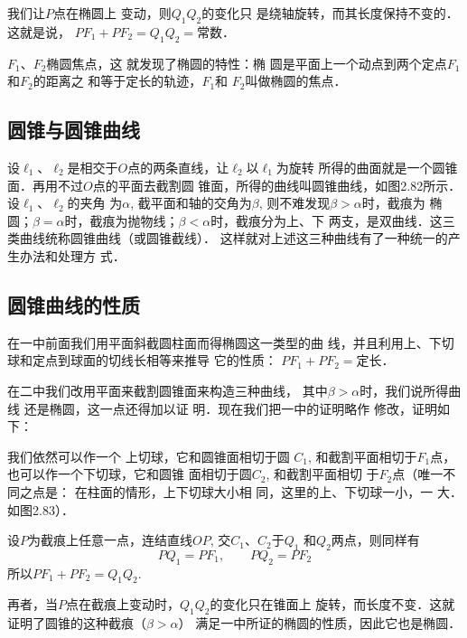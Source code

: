 我们让$P$点在椭圆上
变动，则$Q_1Q_2$的变化只
是绕轴旋转，而其长度保持不变的．这就是说，
$PF_1+PF_2=Q_1Q_2=$常数．

$F_1$、$F_2$椭圆焦点，这
就发现了椭圆的特性：椭
圆是平面上一个动点到两个定点$F_1$和$F_2$的距离之
和等于定长的轨迹，$F_1$和
$F_2$叫做椭圆的焦点．

\subsection{圆锥与圆锥曲线}

设$\ell_1$、$\ell_2$是相交于$O$点的两条直线，让$\ell_2$以$\ell_1$为旋转
所得的曲面就是一个圆锥面．再用不过$O$点的平面去截割圆
锥面，所得的曲线叫圆锥曲线，如图2.82所示．设$\ell_1$、$\ell_2$的夹角
为$\alpha$, 截平面和轴的交角为$\beta$, 则不难发现$\beta>\alpha$时，截痕为
椭圆；$\beta=\alpha$时，截痕为抛物线；$\beta<\alpha$时，截痕分为上、下
两支，是双曲线．这三类曲线统称圆锥曲线（或圆锥截线）．
这样就对上述这三种曲线有了一种统一的产生办法和处理方
式．

\subsection{圆锥曲线的性质}
在一中前面我们用平面斜截圆柱面而得椭圆这一类型的曲
线，并且利用上、下切球和定点到球面的切线长相等来推导
它的性质：
$PF_1+PF_2=$定长．

在二中我们改用平面来截割圆锥面来构造三种曲线，
其中$\beta>\alpha$时，我们说所得曲线
还是椭圆，这一点还得加以证
明．现在我们把一中的证明略作
修改，证明如下：

我们依然可以作一个
上切球，它和圆锥面相切于圆
$C_1$, 和截割平面相切于$F_1$点，
也可以作一个下切球，它和圆锥
面相切于圆$C_2$, 和截割平面相切
于$F_2$点（唯一不同之点是：
在柱面的情形，上下切球大小相
同，这里的上、下切球一小，一
大．如图2.83）．

设$P$为截痕上任意一点，连结直线$OP$, 交$C_1$、$C_2$于$Q_1$
和$Q_2$两点，则同样有
\[PQ_1=PF_1,\qquad PQ_2=PF_2\]
所以$PF_1+PF_2=Q_1Q_2$.

再者，当$P$点在截痕上变动时，$Q_1Q_2$的变化只在锥面上
旋转，而长度不变．这就证明了圆锥的这种截痕（$\beta>\alpha$）
满足一中所证的椭圆的性质，因此它也是椭圆．

